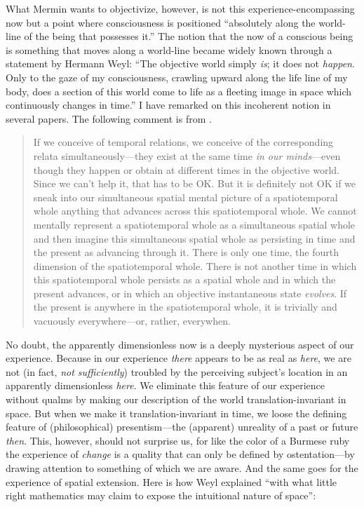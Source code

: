 \documentclass[smallextended]{svjour3}
\newcommand{\bq}{\begin{quote}}
\newcommand{\eq}{\end{quote}}
\begin{document}
What Mermin\cite{Mermin_Nature} wants to objectivize, however, is not this experience-encompassing now but a point where consciousness is positioned ``absolutely along the world-line of the being that possesses it.'' The notion that the now of a conscious being is something that moves along a world-line became widely known through a statement by Hermann Weyl\cite{Weyl1949}: ``The objective world simply \emph{is}; it does not \emph{happen}. Only to the gaze of my consciousness, crawling upward along the life line of my body, does a section of this world come to life as a fleeting image in space which continuously changes in time.'' I have remarked on this incoherent notion in several papers. The following comment is from \cite{18errors}.
\bq
If we conceive of temporal relations, we conceive of the corresponding relata simultaneously---they exist at the same time \emph{in our minds}---even though they happen or obtain at different times in the objective world. Since we can't help it, that has to be OK. But it is definitely not OK if we sneak into our simultaneous spatial mental picture of a spatiotemporal whole anything that advances across this spatiotemporal whole. We cannot mentally represent a spatiotemporal whole as a simultaneous spatial whole and then imagine this simultaneous spatial whole as persisting in time and the present as advancing through it. There is only one time, the fourth dimension of the spatiotemporal whole. There is not another time in which this spatiotemporal whole persists as a spatial whole and in which the present advances, or in which an objective instantaneous state \emph{evolves}. If the present is anywhere in the spatiotemporal whole, it is trivially and vacuously everywhere---or, rather, everywhen.
\eq
No doubt, the apparently dimensionless {now} is a deeply mysterious aspect of our experience. Because in our experience \emph{there} appears to be as real as \emph{here}, we are not (in fact, \emph{not sufficiently}) troubled by the perceiving subject's location in an apparently dimensionless \emph{here}. We eliminate this feature of our experience without qualms by making our description of the world translation-invariant in space. But when we make it translation-invariant in time, we loose the defining feature of (philosophical) presentism---the (apparent) unreality of a past or future \emph{then}. This, however, should not surprise us, for like the color of a Burmese ruby the experience of \emph{change} is a quality that can only be defined by {ostentation}---by drawing attention to something of which we are aware. And the same goes for the experience of spatial extension. Here is how Weyl\cite{Weyl1922} explained ``with what little right mathematics may claim to expose the intuitional nature of space'': 
\end{document}
